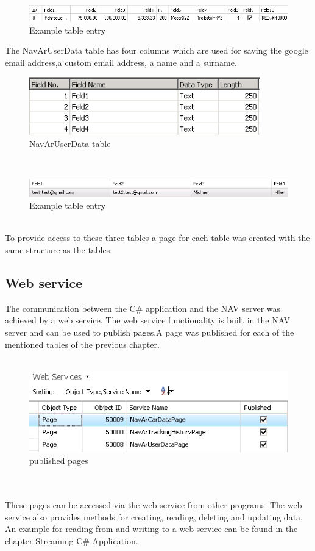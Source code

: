 \begin{figure}[htbp]
\centering
\includegraphics[width=\textwidth,height=\textheight,keepaspectratio]{graphics/cardatatablentry.png}
\caption{Example table entry}
\end{figure}
\newpage
The NavArUserData table has four columns which are used for saving the google email address,a custom email address, a name and a surname.
\\
\begin{figure}[htbp]
\centering
\includegraphics[width=100mm,height=\textheight,keepaspectratio]{graphics/userdatatable.png}
\caption{NavArUserData table }
\end{figure}
\\
\begin{figure}[htbp]
\centering
\includegraphics[width=\textwidth,height=\textheight,keepaspectratio]{graphics/userdatatableentry.png}
\caption{Example table entry}
\end{figure}
\\
To provide access to these three tables a page for each table was created with the same structure as the tables.  
\newpage
\subsection{Web service}
The communication between the C\# application and the NAV server was achieved by a web service. The web service functionality is built in the NAV server and can be used to publish pages.A page was published for each of the mentioned tables of the previous chapter. 
\\\\
\begin{figure}[htbp]
\centering
\includegraphics[width=\textwidth,height=\textheight,keepaspectratio]{graphics/webservice.png}
\caption{published pages}
\end{figure}
\\\\
These pages can be accessed via the web service from other programs. The web service also provides methods for creating, reading, deleting and updating data.
An example for reading from and writing to a web service can be found in the chapter Streaming C\# Application.   
\newpage

